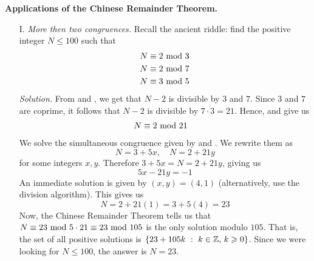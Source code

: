 {\bf Applications of the Chinese Remainder Theorem.}
\begin{itemize}[leftmargin=2em, itemsep=1.5em]
\item[I.] \emph{More then two congruences.} Recall the ancient riddle: find the positive integer $N \leq 100$ such that
\begin{align}
N &\equiv 2\text{ mod }{3}\label{arc1}\\
N &\equiv 2 \text{ mod }{7}\label{arc2}\\
N &\equiv 3 \text{ mod }{5}\label{arc3}
\end{align}
\textsl{Solution.} From  and , we get that $N-2$ is divisible by $3$ and $7$. Since $3$ and $7$ are coprime, it follows that $N-2$ is divisible by $7\cdot 3 = 21$. Hence,  and  give us
\begin{align}
N &\equiv 2 \text{ mod }{21}\label{arc4}
\end{align}
We solve the simultaneous congruence given by  and . We rewrite them as
\[N = 3 + 5x,\quad N = 2 + 21y\]
for some integers $x,y$. Therefore $3 + 5x = N = 2 + 21y$, giving us
\[5x - 21y = -1\]
An immediate solution is given by $(x,y) = (4,1)$ (alternatively, use the division algorithm). This gives us
\[N = 2 + 21(1) = 3 + 5(4) = 23\]
Now, the Chinese Remainder Theorem tells us that $N \equiv 23\text{ mod }{5\cdot 21}\equiv 23\text{ mod }{105}$ is the only solution modulo $105$. That is, the set of all positive solutions is $\left\{23 + 105k\ :\ k \in \mathbb Z,\,k \geqslant 0\right\}$. Since we were looking for $N\leq 100$, the answer is $N = 23$.


\end{itemize}
